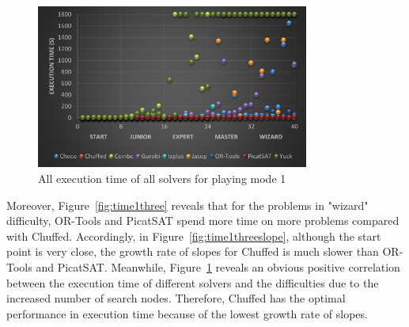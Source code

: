 \begin{figure}[htbp]
\centering
\includegraphics[width=0.8\textwidth]{figs/time1all.png}
\caption{All execution time of all solvers for playing mode 1}
\label{fig:mode1time1}
\end{figure}
Moreover, Figure~\ref{fig:time1three} reveals that for the problems in "wizard" difficulty, OR-Tools and PicatSAT spend more time on more problems compared with Chuffed. Accordingly, in Figure~\ref{fig:time1threeslope}, although the start point is very close, the growth rate of slopes for Chuffed is much slower than OR-Tools and PicatSAT. Meanwhile, Figure~\ref{fig:mode1time1} reveals an obvious positive correlation between the execution time of different solvers and the difficulties due to the increased number of search nodes. Therefore, Chuffed has the optimal performance in execution time because of the lowest growth rate of slopes. 
